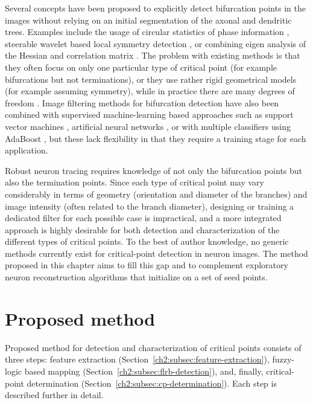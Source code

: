 Several concepts have been proposed to explicitly detect bifurcation points in the images without relying on an initial segmentation of the axonal and dendritic trees. Examples include the usage of circular statistics of phase information \cite{obaraa2012contrast}, steerable wavelet based local symmetry detection \cite{puspoki2013detection}, or combining eigen analysis of the Hessian and correlation matrix \cite{su2012junction}. The problem with existing methods is that they often focus on only one particular type of critical point (for example bifurcations but not terminations), or they use rather rigid geometrical models (for example assuming symmetry), while in practice there are many degrees of freedom \cite{michaelis1994junction}. Image filtering methods for bifurcation detection have also been combined with supervised machine-learning based approaches such as support vector machines \cite{turetken2011automated}, artificial neural networks \cite{bevilacqua2009comparison}, or with multiple classifiers using AdaBoost \cite{zhou2007vascular}, but these lack flexibility in that they require a training stage for each application.

Robust neuron tracing requires knowledge of not only the bifurcation points but also the termination points. Since each type of critical point may vary considerably in terms of geometry (orientation and diameter of the branches) and image intensity (often related to the branch diameter), designing or training a dedicated filter for each possible case is impractical, and a more integrated approach is highly desirable for both detection and characterization of the different types of critical points. To the best of author knowledge, no generic methods currently exist for critical-point detection in neuron images. The method proposed in this chapter aims to fill this gap and to complement exploratory neuron reconstruction algorithms that initialize on a set of seed points.

\section{Proposed method}
\label{ch2:sec:proposed-method}
Proposed method for detection and characterization of critical points consists of three steps: feature extraction (Section~\ref{ch2:subsec:feature-extraction}), fuzzy-logic based mapping (Section~\ref{ch2:subsec:flrb-detection}), and, finally, critical-point determination (Section~\ref{ch2:subsec:cp-determination}). Each step is described further in detail. 

